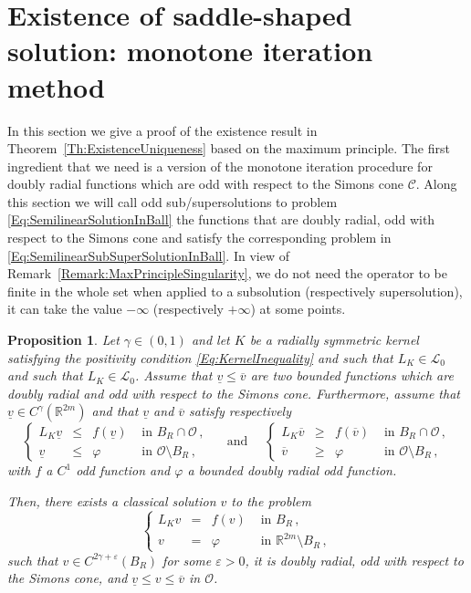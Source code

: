 \documentclass[12pt,reqno]{amsart}
\newtheorem{proposition}[theorem]{Proposition}
\theoremstyle{definition}
\theoremstyle{remark}
\newcommand{\con}[1]{\mathbb{#1}}
\newcommand{\R}{\con{R}} %
\newcommand{\ccal}{\mathscr{C}}
\newcommand{\lcal}{\mathcal{L}}
\newcommand{\ocal}{\mathcal{O}}
\newcommand{\s}{\gamma}
\newcommand\beqc[1]{\left\{\begin{array}{#1}}
\newcommand\eeqc{\end{array} \right.}
\def\PDEsystem{rcll}
\newcommand{\vsub}{\underline{v}}
\newcommand{\vsup}{\overline{v}}
\numberwithin{equation}{section}
\begin{document}


\section{Existence of saddle-shaped solution: monotone iteration method}
\label{Sec:Existence}


In this section we give a proof of the existence result in Theorem~\ref{Th:ExistenceUniqueness} based on the maximum principle. The first ingredient that we need is a version of the monotone iteration procedure for doubly radial functions which are odd with respect to the Simons cone $\ccal$. Along this section we will call odd sub/supersolutions to problem \eqref{Eq:SemilinearSolutionInBall} the functions that are doubly radial, odd with respect to the Simons cone and satisfy the corresponding problem in \eqref{Eq:SemilinearSubSuperSolutionInBall}. In view of Remark~\ref{Remark:MaxPrincipleSingularity}, we do not need the operator to be finite in the whole set when applied to a subsolution (respectively supersolution), it can take the value $-\infty$ (respectively $+\infty$) at some points.

\begin{proposition}
	\label{Prop:MonotoneIterationOdd}
	Let $\s\in (0,1)$ and let $K$ be a radially symmetric kernel  satisfying the positivity condition \eqref{Eq:KernelInequality} and such that $L_K\in \lcal_0$ and such that $L_K\in \lcal_0$. Assume that $\vsub \leq \vsup$ are two bounded functions which are doubly radial and odd with respect to the Simons cone. Furthermore, assume that $\vsub\in C^\s(\R^{2m})$ and that $\vsub$ and $\vsup$ satisfy respectively   
	\begin{equation}
	\label{Eq:SemilinearSubSuperSolutionInBall}
	\beqc{\PDEsystem}
	L_K\vsub & \leq & f(\vsub) & \textrm{ in } B_R \cap \ocal\,, \\
	\vsub & \leq & \varphi & \textrm{ in } \ocal \setminus B_R\,, 
	\eeqc
	\quad \textrm{ and } \quad 
	\beqc{\PDEsystem}
	L_K\vsup & \geq & f(\vsup) & \textrm{ in } B_R \cap \ocal\,, \\
	\vsup & \geq & \varphi & \textrm{ in } \ocal \setminus B_R\,, 
	\eeqc
	\end{equation}
	with $f$ a $C^1$ odd function and $\varphi$ a bounded doubly radial odd function.
	
	Then, there exists a classical solution $v$ to the problem
	\begin{equation}
	\label{Eq:SemilinearSolutionInBall}
	\beqc{\PDEsystem}
	L_K v & = & f(v) & \textrm{ in } B_R\,, \\
	v &=& \varphi &  \textrm{ in } \R^{2m} \setminus B_R\,, 
	\eeqc
	\end{equation}
	such that $v\in C^{2\s+\varepsilon}(B_R)$ for some $\varepsilon>0$, it is doubly radial, odd with respect to the Simons cone, and  $\vsub \leq v \leq \vsup$ in $\ocal$.
\end{proposition}
\end{document}
